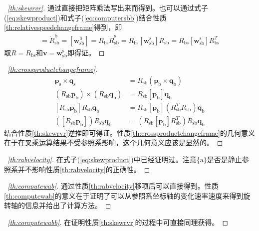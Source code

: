 \documentclass[12pt, a4paper, article, UTF8]{ctexart}
\begin{document}
\begin{proof}[\proofname\ \ref{th:skewrvr}]
通过直接把矩阵乘法写出来而得到。也可以通过式子(\ref{eq:skewproduct})和式子(\ref{eq:computersbb})结合性质\ref{th:relativespeedchangeframe}得到，即
\begin{align}
[R_\text{bs} \mathbf{w}_{\text{sb}}^{\text{s}}] =\dot{R}_{\text{sb}}^{\text{b}} = [\mathbf{w}_{\text{sb}}^{\text{b}}] = R_{\text{bs}} \dot{R}_{\text{sb}}^{\text{s}} = R_{\text{bs}} [\mathbf{w}_{\text{sb}}^{\text{s}}]R_\text{sb} = R_{\text{bs}} [\mathbf{w}_{\text{sb}}^{\text{s}}]R_\text{bs}^T
\end{align}
取$R=R_\text{bs}$和$\mathbf{v}=\mathbf{w}_{\text{sb}}^{\text{s}}$即得证。
\end{proof}

\begin{proof}[\proofname\ \ref{th:crossproductchangeframe}]
\begin{align}
\mathbf{p}_\text{s} \times \mathbf{q}_\text{s} &= R_\text{sb} (\mathbf{p}_\text{b} \times \mathbf{q}_\text{b}) \nonumber \\
(R_\text{sb} \mathbf{p}_\text{b}) \times (R_\text{sb} \mathbf{q}_\text{b}) &= R_\text{sb}[\mathbf{p}_\text{b}]\mathbf{q}_\text{b} \nonumber \\
[R_\text{sb}\mathbf{p}_\text{b}] R_\text{sb} \mathbf{q}_\text{b} &= R_\text{sb}[\mathbf{p}_\text{b}](R^T_\text{sb}R_\text{sb})\mathbf{q}_\text{b} \nonumber \\
([R_\text{sb}\mathbf{p}_\text{b}]) R_\text{sb} \mathbf{q}_\text{b} &= (R_\text{sb}[\mathbf{p}_\text{b}]R^T_\text{sb})R_\text{sb}\mathbf{q}_\text{b}
\end{align}
结合性质\ref{th:skewrvr}逆推即可得证。性质\ref{th:crossproductchangeframe}的几何意义在于在叉乘运算结果不受参照系影响，这个几何意义应该是显然的。
\end{proof}


\begin{proof}[\proofname\ \ref{th:rabvelocity}]
在式子(\ref{eq:skewproduct})中已经证明过。注意$\{\text{a}\}$是否是静止参照系并不影响性质\ref{th:rabvelocity}的正确性。
\end{proof}

\begin{proof}[\proofname\ \ref{th:computewab}]
通过性质\ref{th:rabvelocity}移项后可以直接得到。性质\ref{th:computewab}的意义在于证明了可以从参照系坐标轴的变化速率速度来得到旋转轴的信息并给出了计算方法。
\end{proof}

\begin{proof}[\proofname\ \ref{th:computewabb}]
在证明性质\ref{th:skewrvr}的过程中可直接同理获得。
\end{proof}
\end{document}
